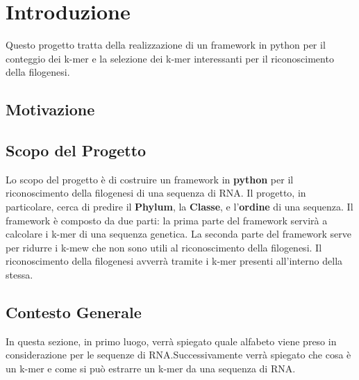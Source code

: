 \chapter{Introduzione}
\label{chap:intro}
\newcommand{\klenght}{\textit{k }}
\newcommand{\slenght}{\textbf{L }}
\newcommand{\vslenght}[1]{\textit{#1}}

Questo progetto tratta della realizzazione di un framework in python per il conteggio dei k-mer e la selezione dei k-mer interessanti per il riconoscimento della filogenesi.

\section{Motivazione}

\section{Scopo del Progetto}
Lo scopo del progetto \`e di costruire un framework in \textbf{python} per il riconoscimento della filogenesi di una sequenza di RNA.
Il progetto, in particolare, cerca di predire il \textbf{Phylum}, la \textbf{Classe}, e l'\textbf{ordine} di una sequenza.
Il framework \`e composto da due parti: la prima parte del framework servir\`a a calcolare i k-mer di una sequenza genetica.
La seconda parte del framework serve per ridurre i k-mew che non sono utili al riconoscimento della filogenesi.
Il riconoscimento della filogenesi avverr\`a tramite i k-mer presenti all'interno della stessa.

\section{Contesto Generale}
    In questa sezione, in primo luogo, verr\`a spiegato quale alfabeto viene preso in considerazione per le sequenze
    di RNA.Successivamente verr\`a spiegato che cosa \`e un k-mer e come si pu\`o estrarre un k-mer da una sequenza di RNA.
